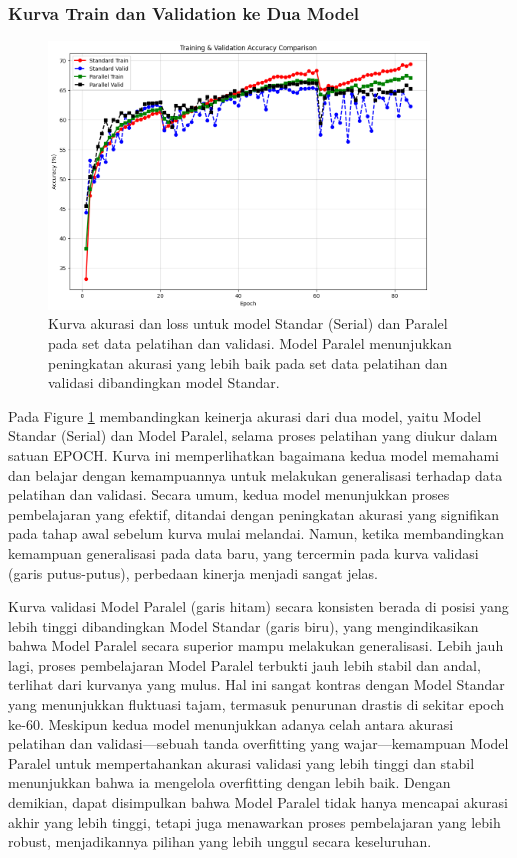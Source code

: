 \documentclass{article}
\begin{document}
\subsubsection{Kurva Train dan Validation ke Dua Model} 
\begin{figure}[H]
    \centerline{\includegraphics[width=0.9\textwidth,height=0.3\textheight]{Hasil/PRocess_Training_Validation_Accuracy.png}}
    \caption{Kurva akurasi dan loss untuk model Standar (Serial) dan Paralel pada set data pelatihan dan validasi. Model Paralel menunjukkan peningkatan akurasi yang lebih baik pada set data pelatihan dan validasi dibandingkan model Standar.}
    \label{fig:Figure 2}
\end{figure}
Pada Figure \ref{fig:Figure 2} membandingkan keinerja akurasi dari dua model, yaitu Model Standar (Serial) dan Model Paralel,
selama proses pelatihan yang diukur dalam satuan EPOCH. Kurva ini memperlihatkan bagaimana kedua model memahami dan belajar dengan 
kemampuannya untuk melakukan generalisasi terhadap data pelatihan dan validasi. Secara umum, kedua model menunjukkan proses pembelajaran yang efektif, ditandai dengan peningkatan akurasi yang signifikan pada tahap awal sebelum kurva mulai melandai. Namun, ketika membandingkan kemampuan generalisasi pada data baru, yang tercermin pada kurva validasi (garis putus-putus),
perbedaan kinerja menjadi sangat jelas. 

Kurva validasi Model Paralel (garis hitam) secara konsisten berada di posisi yang lebih tinggi dibandingkan Model Standar (garis biru), yang mengindikasikan 
bahwa Model Paralel secara superior mampu melakukan generalisasi. Lebih jauh lagi, proses pembelajaran Model Paralel terbukti jauh lebih 
stabil dan andal, terlihat dari kurvanya yang mulus. Hal ini sangat kontras dengan Model Standar yang menunjukkan fluktuasi tajam, 
termasuk penurunan drastis di sekitar epoch ke-60. Meskipun kedua model menunjukkan adanya celah antara akurasi pelatihan dan validasi—sebuah 
tanda overfitting yang wajar—kemampuan Model Paralel untuk mempertahankan akurasi validasi yang lebih tinggi dan stabil menunjukkan bahwa ia mengelola 
overfitting dengan lebih baik. Dengan demikian, dapat disimpulkan bahwa Model Paralel tidak hanya mencapai akurasi akhir yang lebih tinggi, tetapi juga menawarkan proses pembelajaran yang lebih robust, menjadikannya pilihan yang lebih unggul secara keseluruhan.
\end{document}

